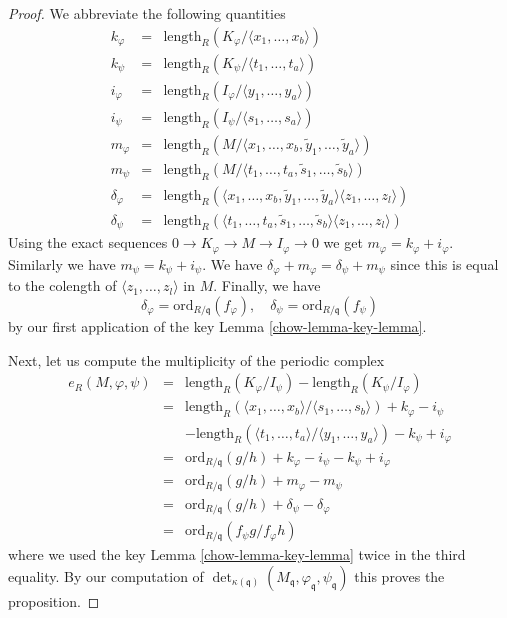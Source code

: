 \begin{proof}
\medskip\noindent
We abbreviate the following quantities
\begin{eqnarray*}
k_\varphi & = & \text{length}_R(K_\varphi/\langle x_1, \ldots, x_b\rangle) \\
k_\psi    & = & \text{length}_R(K_\psi/\langle t_1, \ldots, t_a\rangle) \\
i_\varphi & = & \text{length}_R(I_\varphi/\langle y_1, \ldots, y_a\rangle) \\
i_\psi    & = & \text{length}_R(I_\psi/\langle s_1, \ldots, s_a\rangle) \\
m_\varphi & = & \text{length}_R(M/
\langle x_1, \ldots, x_b, \tilde y_1, \ldots, \tilde y_a\rangle) \\
m_\psi    & = & \text{length}_R(M/
\langle t_1, \ldots, t_a, \tilde s_1, \ldots, \tilde s_b\rangle) \\
\delta_\varphi & = & \text{length}_R(
\langle x_1, \ldots, x_b, \tilde y_1, \ldots, \tilde y_a\rangle
\langle z_1, \ldots, z_l\rangle) \\
\delta_\psi & = & \text{length}_R(
\langle t_1, \ldots, t_a, \tilde s_1, \ldots, \tilde s_b\rangle
\langle z_1, \ldots, z_l\rangle)
\end{eqnarray*}
Using the exact sequences $0 \to K_\varphi \to M \to I_\varphi \to 0$
we get $m_\varphi = k_\varphi + i_\varphi$. Similarly we have
$m_\psi = k_\psi + i_\psi$. We have
$\delta_\varphi + m_\varphi = \delta_\psi + m_\psi$ since this
is equal to the colength of $\langle z_1, \ldots, z_l \rangle$
in $M$. Finally, we have
$$
\delta_\varphi = \text{ord}_{R/\mathfrak q}(f_\varphi),
\quad
\delta_\psi = \text{ord}_{R/\mathfrak q}(f_\psi)
$$
by our first application of the key Lemma \ref{chow-lemma-key-lemma}.

\medskip\noindent
Next, let us compute the multiplicity of the periodic complex
\begin{eqnarray*}
e_R(M, \varphi, \psi) & = &
\text{length}_R(K_\varphi/I_\psi) - \text{length}_R(K_\psi/I_\varphi) \\
& = &
\text{length}_R(
\langle x_1, \ldots, x_b\rangle/
\langle s_1, \ldots, s_b\rangle)
+ k_\varphi - i_\psi \\
& & -
\text{length}_R(
\langle t_1, \ldots, t_a\rangle/
\langle y_1, \ldots, y_a\rangle)
- k_\psi + i_\varphi \\
& = &
\text{ord}_{R/\mathfrak q}(g/h) + k_\varphi - i_\psi - k_\psi + i_\varphi \\
& = &
\text{ord}_{R/\mathfrak q}(g/h) + m_\varphi - m_\psi \\
& = &
\text{ord}_{R/\mathfrak q}(g/h) + \delta_\psi - \delta_\varphi \\
& = &
\text{ord}_{R/\mathfrak q}(f_\psi g/f_\varphi h)
\end{eqnarray*}
where we used the key Lemma \ref{chow-lemma-key-lemma} twice in the third equality.
By our computation of $\det_{\kappa(\mathfrak q)}
(M_{\mathfrak q}, \varphi_{\mathfrak q}, \psi_{\mathfrak q})$
this proves the proposition.
\end{proof}

